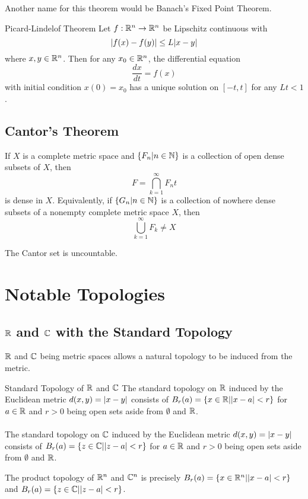 \documentclass[a4paper]{article}
\begin{document}
Another name for this theorem would be Banach's Fixed Point Theorem. 

\begin{thm}{Picard-Lindelof Theorem}{} Let $f:\mathbb{R}^n\to\mathbb{R}^n$ be Lipschitz continuous with $$\abs{f(x)-f(y)}\leq L\abs{x-y}$$ where $x,y\in\mathbb{R}^n$. Then for any $x_0\in\mathbb{R}^n$, the differential equation $$\frac{dx}{dt}=f(x)$$ with initial condition $x(0)=x_0$ has a unique solution on $[-t,t]$ for any $Lt<1$. 
\end{thm}

\subsection{Cantor's Theorem}
\begin{thm}{}{} If $X$ is a complete metric space and $\{F_n|n\in\mathbb{N}\}$ is a collection of open dense subsets of $X$, then $$F=\bigcap_{k=1}^\infty F_nt$$ is dense in $X$. Equivalently, if $\{G_n|n\in\mathbb{N}\}$ is a collection of nowhere dense subsets of a nonempty complete metric space $X$, then $$\bigcup_{k=1}^\infty F_k\neq X$$
\end{thm}

\begin{lmm}{}{} The Cantor set is uncountable. 
\end{lmm}



\pagebreak
\section{Notable Topologies}
\subsection{$\mathbb{R}$ and $\mathbb{C}$ with the Standard Topology}
$\mathbb{R}$ and $\mathbb{C}$ being metric spaces allows a natural topology to be induced from the metric. 
\begin{defn}{Standard Topology of $\mathbb{R}$ and $\mathbb{C}$}{} The standard topology on $\mathbb{R}$ induced by the Euclidean metric $d(x,y)=\abs{x-y}$ consists of $B_r(a)=\{x\in\mathbb{R}|\abs{x-a}<r\}$ for $a\in\mathbb{R}$ and $r>0$ being open sets aside from $\emptyset$ and $\mathbb{R}$. \\~\\
The standard topology on $\mathbb{C}$ induced by the Euclidean metric $d(x,y)=\abs{x-y}$ consists of $B_r(a)=\{z\in\mathbb{C}|\abs{z-a}<r\}$ for $a\in\mathbb{R}$ and $r>0$ being open sets aside from $\emptyset$ and $\mathbb{R}$. 
\end{defn}

\begin{prp}{}{} The product topology of $\mathbb{R}^n$ and $\mathbb{C}^n$ is precisely $B_r(a)=\{x\in\mathbb{R}^n|\abs{x-a}<r\}$ and $B_r(a)=\{z\in\mathbb{C}|\abs{z-a}<r\}$. 
\end{prp}
\end{document}
